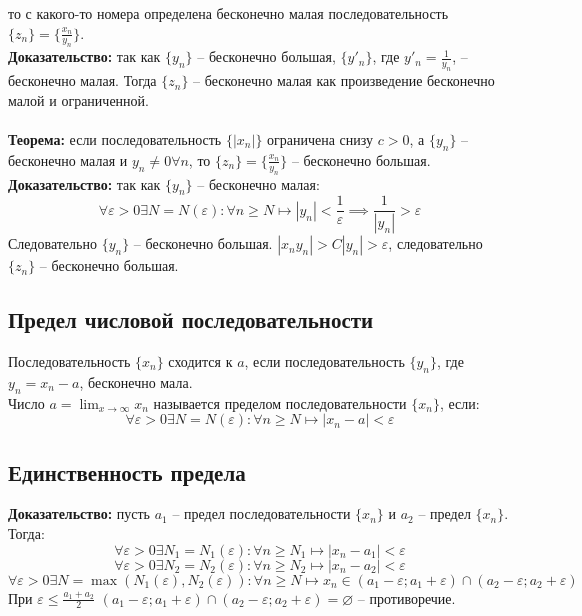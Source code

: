 \documentclass{article}
\begin{document}
        то с какого-то номера определена бесконечно малая последовательность $\{z_n\} = \{\frac{x_n}{y_n}\}$.
        \\
        \textbf{Доказательство:}
        так как $\{y_n\}$ -- бесконечно большая, $\{y'_n\}$, где $y'_n = \frac{1}{y_n}$, -- бесконечно малая. Тогда $\{z_n\}$ -- бесконечно малая как
        произведение бесконечно малой и ограниченной.
        \\
        \\
        \textbf{Теорема:} если последовательность $\{|x_n|\}$ ограничена снизу $c > 0$, а $\{y_n\}$ -- бесконечно малая и $y_n \neq 0 \forall n$,
        то $\{z_n\} = \{\frac{x_n}{y_n}\}$ -- бесконечно большая.
        \\
        \textbf{Доказательство:}
        так как $\{y_n\}$ -- бесконечно малая:
        \[ \forall \varepsilon > 0 \exists N = N(\varepsilon): \forall n \ge N \longmapsto |y_n| < \frac{1}{\varepsilon} \implies \frac{1}{|y_n|} > {\varepsilon}\]
        Следовательно $\{y_n\}$ -- бесконечно большая. $ |x_ny_n| > C|y_n| > \varepsilon $, следовательно $\{z_n\}$ -- бесконечно большая.
    
    
    \subsection*{Предел числовой последовательности}
        Последовательность $\{x_n\}$ сходится к $a$, если последовательность $\{y_n\}$, где $y_n = x_n - a$, бесконечно мала.
        \\
        Число $a = \lim_{x\to\infty} x_n$ называется пределом последовательности $\{x_n\}$, если:
        \\
        \[ \forall \varepsilon > 0 \exists N = N(\varepsilon): \forall n \ge N \longmapsto |x_n - a| < \varepsilon \]
    
    
    \subsection*{Единственность предела}
        \textbf{Доказательство:}
        пусть $a_1$ -- предел последовательности $\{x_n\}$ и $a_2$ -- предел $\{x_n\}$. Тогда:
        \[ \forall \varepsilon > 0 \exists N_1 = N_1(\varepsilon): \forall n \ge N_1 \longmapsto |x_n - a_1| < \varepsilon \]
        \[ \forall \varepsilon > 0 \exists N_2 = N_2(\varepsilon): \forall n \ge N_2 \longmapsto |x_n - a_2| < \varepsilon \]
        \[ \forall \varepsilon > 0 \exists N = \max (N_1(\varepsilon), N_2(\varepsilon)): \forall n \ge N \longmapsto
        x_n \in (a_1 - \varepsilon; a_1 + \varepsilon) \cap (a_2 - \varepsilon; a_2 + \varepsilon) \]
        При $\varepsilon \le \frac{a_1 + a_2}{2}$ $(a_1 - \varepsilon; a_1 + \varepsilon) \cap (a_2 - \varepsilon; a_2 + \varepsilon) = \varnothing$ -- противоречие.
    
\end{document}

